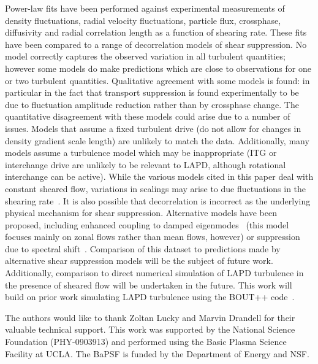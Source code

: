 \documentclass[aip,pop,amsmath,amssymb,preprint,superscriptaddress]{revtex4-1} %
\begin{document}
Power-law fits have been performed against experimental measurements
of density fluctuations, radial velocity fluctuations, particle flux,
crossphase, diffusivity and radial correlation length as a function of
shearing rate.  These fits have been compared to a range of
decorrelation models of shear suppression. No model correctly captures
the observed variation in all turbulent quantities; however some
models do make predictions which are close to observations for one or
two turbulent quantities.  Qualitative agreement with some models is
found: in particular in the fact that transport suppression is found
experimentally to be due to fluctuation amplitude reduction rather
than by crossphase change.  The quantitative disagreement with
these models could arise due to a number of issues.  Models that
assume a fixed turbulent drive (do not allow for changes in density
gradient scale length) are unlikely to match the data.  Additionally,
many models assume a turbulence model which may be inappropriate (ITG
or interchange drive are unlikely to be relevant to LAPD, although
rotational interchange can be active). While the various models cited in this paper deal with constant sheared flow, variations in scalings may arise to due fluctuations in the shearing rate~\cite{kim04,leconte06,newton07}.  It is also possible
that decorrelation is incorrect as the underlying physical mechanism
for shear suppression.  Alternative models have been proposed,
including enhanced coupling to damped eigenmodes~\cite{terry06} (this model focuses
mainly on zonal flows rather than mean flows, however) or suppression
due to spectral shift~\cite{staebler13}.  Comparison of this dataset to
predictions made by alternative shear suppression models will be the
subject of future work.  Additionally, comparison to direct numerical
simulation of LAPD turbulence in the presence of sheared flow will
be undertaken in the future.  This work will build on prior work simulating LAPD turbulence
using the BOUT++ code~\cite{friedman12,umansky11,popovich10BOUT}.

The authors would like to thank Zoltan Lucky and Marvin Drandell for their valuable technical support.  This work
was supported by the National Science Foundation (PHY-0903913) and performed using the Basic Plasma Science Facility at UCLA. The BaPSF is funded by the
Department of Energy and NSF.
\end{document}
